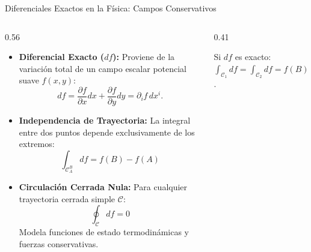 \documentclass[10pt,aspectratio=169]{beamer}
\begin{document}
\begin{frame}{Diferenciales Exactos en la Física: Campos Conservativos}
  \begin{columns}[c]
    \begin{column}{0.56\textwidth}
      \footnotesize
      \begin{itemize}\itemsep2pt
        \item \textbf{Diferencial Exacto ($df$):}
        Proviene de la variación total de un campo escalar potencial suave $f(x, y)$:
        \[
        df = \frac{\partial f}{\partial x} dx + \frac{\partial f}{\partial y} dy = \partial_i f\, dx^i.
        \]
        \item \textbf{Independencia de Trayectoria:}
        La integral entre dos puntos depende exclusivamente de los extremos:
        \[
        \boxed{\int_{\mathcal{C}_A^B} df = f(B) - f(A)}
        \]
        \item \textbf{Circulación Cerrada Nula:}
        Para cualquier trayectoria cerrada simple $\mathcal{C}$:
        \[
        \boxed{\oint_\mathcal{C} df = 0}
        \]
        Modela funciones de estado termodinámicas y fuerzas conservativas.
      \end{itemize}
    \end{column}
    \begin{column}{0.41\textwidth}
      \centering
      \vspace{0.1cm}
      {\scriptsize Si $df$ es exacto: $\int_{\mathcal{C}_1} df = \int_{\mathcal{C}_2} df = f(B)-f(A)$.}
    \end{column}
  \end{columns}
\end{frame}
\end{document}

